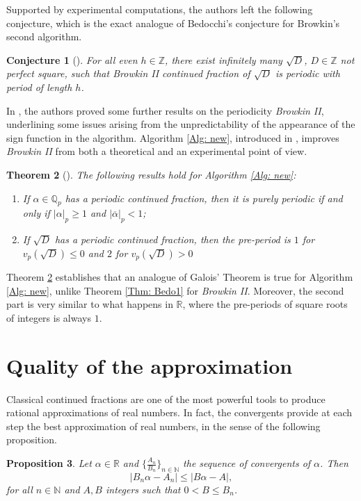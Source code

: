 \documentclass[12pt, reqno]{amsart}
\theoremstyle{plain}
\newtheorem{Theorem}{Theorem}
\newtheorem{Proposition}[Theorem]{Proposition}
\newtheorem{Conjecture}[Theorem]{Conjecture}
\theoremstyle{definition}
\begin{document}
Supported by experimental computations, the authors left the following conjecture, which is the exact analogue of Bedocchi's conjecture for Browkin's second algorithm.

\begin{Conjecture}[\cite{MRSI}]
For all even $h\in\mathbb{Z}$, there exist infinitely many $\sqrt{D}$, $D\in\mathbb{Z}$ not perfect square, such that \textit{Browkin II} continued fraction of $\sqrt{D}$ is periodic with period of length $h$.
\end{Conjecture}

In \cite{MR}, the authors proved some further results on the periodicity \textit{Browkin II}, underlining some issues arising from the unpredictability of the appearance of the sign function in the algorithm. Algorithm \eqref{Alg: new}, introduced in \cite{MR}, improves \textit{Browkin II} from both a theoretical and an experimental point of view.

\begin{Theorem}[\cite{MR}]\label{Thm: newalg}
The following results hold for Algorithm \eqref{Alg: new}:
\begin{enumerate}
\item[i)] If $\alpha\in\mathbb{Q}_p$ has a periodic continued fraction, then it is purely periodic if and only if $|\alpha|_p\geq 1$ and $|\overline{\alpha}|_p<1$;
\item[ii)] If $\sqrt{D}$ has a periodic continued fraction, then the pre-period is $1$ for $v_p(\sqrt{D})\leq 0$ and $2$ for $v_p(\sqrt{D})> 0$
\end{enumerate}
\end{Theorem}

Theorem \ref{Thm: newalg} establishes that an analogue of Galois' Theorem is true for Algorithm \eqref{Alg: new}, unlike Theorem \ref{Thm: Bedo1} for \textit{Browkin II}. Moreover, the second part is very similar to what happens in $\mathbb{R}$, where the pre-periods of square roots of integers is always $1$.

\section{Quality of the approximation}\label{Sec: approxi}
Classical continued fractions are one of the most powerful tools to produce rational approximations of real numbers. In fact, the convergents provide at each step the best approximation of real numbers, in the sense of the following proposition.
\begin{Proposition}\label{Pro: bestapprox}
Let $\alpha\in\mathbb{R}$ and $\{\frac{A_n}{B_n}\}_{n\in\mathbb{N}}$ the sequence of convergents of $\alpha$. Then
\[|B_n\alpha-A_n|\leq |B\alpha-A|,\]
for all $n\in\mathbb{N}$ and $A,B$  integers such that $0<B\leq B_n$.
\end{Proposition}
\end{document}
